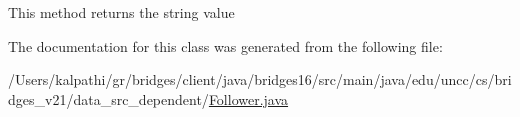 This method returns the string value 

The documentation for this class was generated from the following file\+:\begin{DoxyCompactItemize}
\item 
/\+Users/kalpathi/gr/bridges/client/java/bridges16/src/main/java/edu/uncc/cs/bridges\+\_\+v21/data\+\_\+src\+\_\+dependent/\hyperlink{_follower_8java}{Follower.\+java}\end{DoxyCompactItemize}
